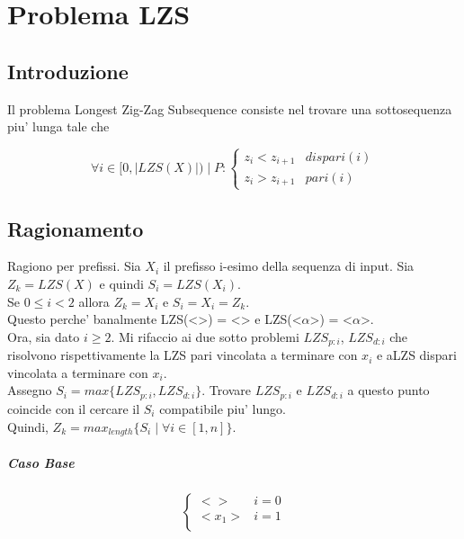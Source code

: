 \chapter{Problema LZS}

\section{Introduzione}

Il problema Longest Zig-Zag Subsequence consiste nel trovare una sottosequenza piu' lunga tale che

\[
    \forall i \in [0, |LZS(X)|) \mid P :
    \begin{cases}
        \text{$z_i < z_{i+1}$} & \text{$dispari(i)$} \\
        \text{$z_i > z_{i+1}$} & \text{$pari(i)$}
    \end{cases}
\]

\section{Ragionamento}

Ragiono per prefissi.
Sia $X_{i}$ il prefisso i-esimo della sequenza di input.
Sia $Z_k = LZS(X)$ e quindi $S_i = LZS(X_{i})$. \\

Se $ 0\leq i < 2$ allora $Z_k = X_{i}$ e $S_i = X_i = Z_k$. \\
Questo perche' banalmente LZS(<>) = <> e LZS(<$\alpha$>) = <$\alpha$>. \\

Ora, sia dato $i \geq 2$. Mi rifaccio ai due sotto problemi $LZS_{p:i}$, $LZS_{d:i}$ che risolvono rispettivamente la LZS pari vincolata a terminare con $x_i$ e aLZS dispari vincolata a terminare con $x_i$. \\
Assegno $S_{i} = max \{ LZS_{p:i}, LZS_{d:i} \}$.
Trovare $LZS_{p:i}$ e $LZS_{d:i}$ a questo punto coincide con il cercare il $S_{i}$ compatibile piu' lungo. \\
Quindi, $Z_k = max_{length} \{ S_{i} \mid \forall i \in [1,n] \}$.

\paragraph{Caso Base}

\[
    \begin{cases}
        \text{$<>$} & \text{$i = 0$} \\
        \text{$<x_1>$} & \text{$i = 1$} \\
    \end{cases}
\]

